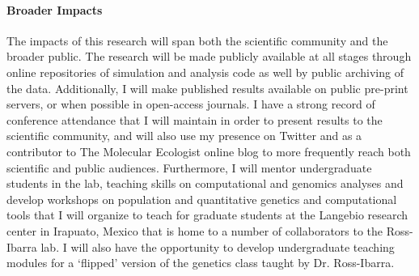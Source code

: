 \paragraph{Broader Impacts}

The impacts of this research will span both the scientific community and the broader public. The research will be made publicly available at all stages through online repositories of simulation and analysis code as well by public archiving of the data. Additionally, I will make published results available on public pre-print servers, or when possible in open-access journals. I have a strong record of conference attendance that I will maintain in order to present results to the scientific community, and will also use my presence on Twitter and as a contributor to The Molecular Ecologist online blog to more frequently reach both scientific and public audiences. Furthermore, I will mentor undergraduate students in the lab, teaching skills on computational and genomics analyses and develop workshops on population and quantitative genetics and computational tools that I will organize to teach for graduate students at the Langebio research center in Irapuato, Mexico that is home to a number of collaborators to the Ross-Ibarra lab. I will also have the opportunity to develop undergraduate teaching modules for a `flipped' version of the genetics class taught by Dr. Ross-Ibarra.







